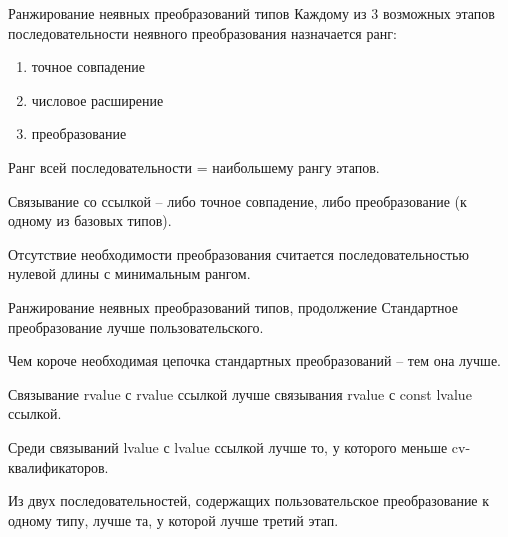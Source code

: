\documentclass[unknownkeysallowed,xcolor=table]{beamer}
\begin{document}
\begin{frame}{Ранжирование неявных преобразований типов}
  Каждому из 3 возможных этапов последовательности неявного преобразования назначается ранг:
  \begin{enumerate}
    \item точное совпадение
    \item числовое расширение
    \item преобразование
  \end{enumerate}

  \vspace{1em}

  Ранг всей последовательности = наибольшему рангу этапов.

  \vspace{1em}

  Связывание со ссылкой -- либо точное совпадение, либо преобразование (к одному из базовых типов).

  \vspace{1em}

  Отсутствие необходимости преобразования считается последовательностью нулевой длины с минимальным рангом.
\end{frame}

\begin{frame}{Ранжирование неявных преобразований типов, продолжение}
  Стандартное преобразование лучше пользовательского.

  \vspace{1em}

  Чем короче необходимая цепочка стандартных преобразований -- тем она лучше.

  \vspace{1em}

  Связывание rvalue с rvalue ссылкой лучше связывания rvalue с const lvalue ссылкой.

  \vspace{1em}

  Среди связываний lvalue с lvalue ссылкой лучше то, у которого меньше cv-квалификаторов.

  \vspace{1em}

  Из двух последовательностей, содержащих пользовательское преобразование к одному типу, лучше та, у которой лучше третий этап.
\end{frame}
\end{document}
